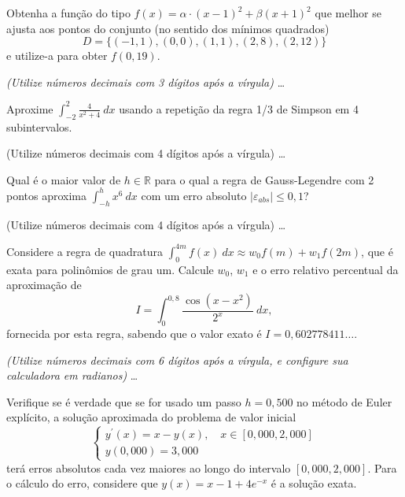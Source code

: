 \documentclass[12pt,a4paper]{article}
\begin{document}
\begin{ExerciseList}
\Exercise[title={2,5}]
Obtenha a função do tipo $f(x) = \alpha \cdot (x-1)^2 + \beta (x+1)^2$ que melhor se ajusta aos pontos do conjunto (no sentido dos mínimos quadrados)
\[
D = \{(-1, 1), (0, 0), (1, 1), (2, 8), (2, 12)\}
\]
e utilize-a para obter $f(0,19)$.

{\color{blue} \textit{(Utilize números decimais com 3 dígitos após a vírgula)}}
\Answer
\color{red}
\ldots



\Exercise[title={2,5}]
Aproxime $\int_{-2}^{2} \frac{4}{x^2+4}\ dx$ usando a repetição da regra 1/3 de Simpson em 4 subintervalos.

{\color{blue} (Utilize números decimais com 4 dígitos após a vírgula)}
\Answer
\color{red}
\ldots


\Exercise[title={2,5}]
Qual é o maior valor de $h \in \mathbb{R}$ para o qual a regra de Gauss-Legendre com 2 pontos aproxima $\int_{-h}^h x^6 \ dx$ com um erro absoluto $|\varepsilon_{abs}| \leq 0,1$?

{\color{blue} (Utilize números decimais com 4 dígitos após a vírgula)}
\Answer \ldots



\Exercise[title={2,5}]
Considere a regra de quadratura $\int_0^{4m} f(x)\ dx \approx w_0 f(m) + w_1 f(2m)$, que é exata para polinômios de grau um. Calcule $w_0$, $w_1$ e o erro relativo percentual da aproximação de
\[
I = \int_0^{0,8} \frac{\cos(x-x^2)}{2^x} \ dx,
\]
fornecida por esta regra, sabendo que o valor exato é $I = 0,602778411\ldots$.

{\color{blue} \textit{(Utilize números decimais com 6 dígitos após a vírgula, e configure sua calculadora em radianos)}}
\Answer \ldots


\Exercise[title={2,5}]
Verifique se é verdade que se for usado um passo $h=0,500$ no método de Euler explícito, a solução aproximada do problema de valor inicial
\[
\begin{cases}
y^\prime(x) = x-y(x), \quad x \in [0,000, 2,000]\\
y(0,000) = 3,000
\end{cases}
\]
terá erros absolutos cada vez maiores ao longo do intervalo $[0,000, 2,000]$. Para o cálculo do erro, considere que $y(x)=x-1+4e^{-x}$ é a solução exata.


\end{ExerciseList}
\end{document}

